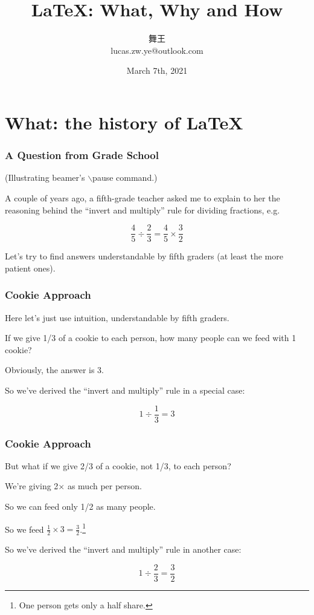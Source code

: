 \documentclass{beamer}
\title{\LaTeX: What, Why and How}
\author{ 舞王\\ lucas.zw.ye@outlook.com }
\date{March 7th, 2021}
\begin{document}
\begin{frame}
\titlepage
\end{frame}

\section{What: the history of \LaTeX}

\begin{frame}
\frametitle{A Question from Grade School}

(Illustrating {\sc beamer}'s $\backslash$pause command.)
\vskip 0.5in

A couple of years ago, a fifth-grade teacher asked me to explain to her
the reasoning behind the ``invert and multiply'' rule for dividing
fractions, e.g.
\pause  %

$$
\frac{4}{5} \div \frac{2}{3} = \frac{4}{5} \times \frac{3}{2}
$$

\pause

Let's try to find answers understandable by fifth graders (at least the
more patient ones).

\end{frame}

\begin{frame}
\frametitle{Cookie Approach}

Here let's just use intuition, understandable by fifth graders.

\pause

If we give 1/3 of a cookie to each person, how many people can we
feed with 1 cookie?  

\pause

Obviously, the answer is 3.

So we've derived the ``invert and multiply'' rule in a special case:

$$
1 \div \frac{1}{3} = 3
$$

\end{frame}

\begin{frame}
\frametitle{Cookie Approach}

But what if we give 2/3 of a cookie, not 1/3, to each person?  

We're giving 2$\times$ as much per person. 

So we can feed only 1/2 as many people. 

So we feed  $\frac{1}{2} \times 3 = \frac{3}{2}$.\footnote{One person
gets only a half share.}

So we've derived the ``invert and multiply'' rule in another case:

$$
1 \div \frac{2}{3} = \frac{3}{2}
$$

\end{frame}
\end{document}
